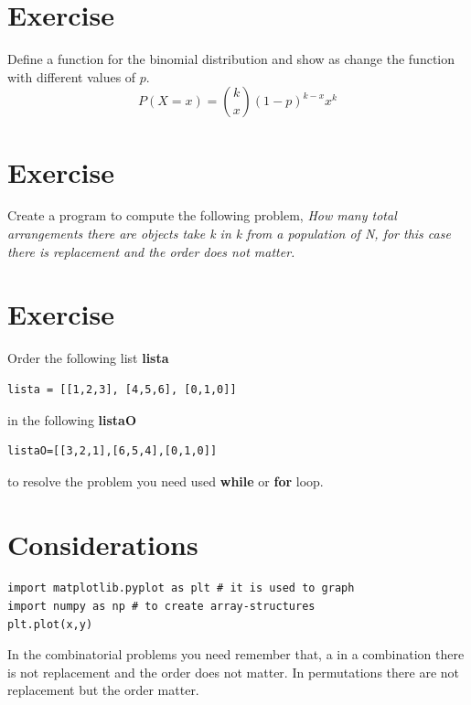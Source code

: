 \documentclass[10pt,a4paper]{article}
\begin{document}
\section{Exercise}

Define a function for the binomial distribution and show as change the function with different values of $p$.
\begin{equation}
P(X=x) = \binom{k}{x}(1-p)^{k-x}x^{k}
\end{equation}

\section{Exercise }

Create a program to compute the following problem, \emph{How many total arrangements there are objects  take k in k from a population of N, for this case there is replacement and the order does not matter.}



\section{Exercise}

Order the following list \textbf{lista}
\begin{lstlisting}
lista = [[1,2,3], [4,5,6], [0,1,0]]
\end{lstlisting}
in the following \textbf{listaO}
\begin{lstlisting}
listaO=[[3,2,1],[6,5,4],[0,1,0]]
\end{lstlisting}

to resolve the problem you need used \textbf{while} or \textbf{for} loop.

\section{Considerations}

\begin{lstlisting}
import matplotlib.pyplot as plt # it is used to graph 
import numpy as np # to create array-structures
plt.plot(x,y)
\end{lstlisting}

In the combinatorial problems you need remember that, a in a combination there is not replacement and the order does not matter. In permutations there are not replacement but the order matter.
\end{document}

